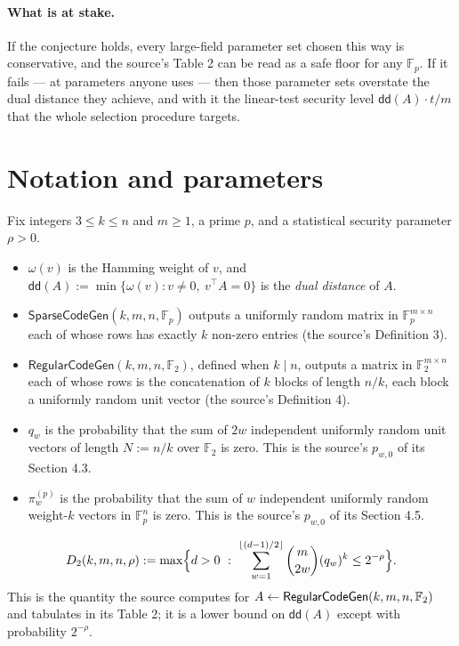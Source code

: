 \documentclass{aicr-conjecture}
\newcommand{\F}{\mathbb{F}}
\newcommand{\dd}{\mathsf{dd}}
\newcommand{\SparseCodeGen}{\mathsf{SparseCodeGen}}
\newcommand{\RegularCodeGen}{\mathsf{RegularCodeGen}}
\newcommand{\wt}{\omega}
\begin{document}
\paragraph{What is at stake.}
If the conjecture holds, every large-field parameter set chosen this way
is conservative, and the source's Table 2 can be read as a safe floor
for any $\F_{p}$. If it fails --- at parameters anyone uses --- then
those parameter sets overstate the dual distance they achieve, and with
it the linear-test security level $\dd(A) \cdot t / m$ that the whole
selection procedure targets.

\section{Notation and parameters}\label{sec:notation}

Fix integers $3 \le k \le n$ and $m \ge 1$, a prime $p$, and a
statistical security parameter $\rho > 0$.

\begin{itemize}[nosep]
  \item $\wt(v)$ is the Hamming weight of $v$, and
    $\dd(A) := \min \{ \wt(v) : v \ne 0,\ v^{\top} A = 0 \}$ is the
    \emph{dual distance} of $A$.
  \item $\SparseCodeGen(k, m, n, \F_{p})$ outputs a uniformly random
    matrix in $\F_{p}^{m \times n}$ each of whose rows has exactly $k$
    non-zero entries (the source's Definition 3).
  \item $\RegularCodeGen(k, m, n, \F_{2})$, defined when $k \mid n$,
    outputs a matrix in $\F_{2}^{m \times n}$ each of whose rows is the
    concatenation of $k$ blocks of length $n/k$, each block a uniformly
    random unit vector (the source's Definition 4).
  \item $q_{w}$ is the probability that the sum of $2w$ independent
    uniformly random unit vectors of length $N := n/k$ over $\F_{2}$ is
    zero. This is the source's $p_{w,0}$ of its Section 4.3.
  \item $\pi^{(p)}_{w}$ is the probability that the sum of $w$
    independent uniformly random weight-$k$ vectors in $\F_{p}^{n}$ is
    zero. This is the source's $p_{w,0}$ of its Section 4.5.
\end{itemize}

\begin{definition}\label{def:dtwo}
\[
  D_{2}(k, m, n, \rho)
  := \max \Bigl\{ d > 0 \ :\
     \sum_{w=1}^{\lfloor (d-1)/2 \rfloor} \binom{m}{2w} (q_{w})^{k}
     \le 2^{-\rho} \Bigr\}.
\]
This is the quantity the source computes for
$A \sample \RegularCodeGen(k, m, n, \F_{2})$ and tabulates in its
Table 2; it is a lower bound on $\dd(A)$ except with probability
$2^{-\rho}$.
\end{definition}
\end{document}
